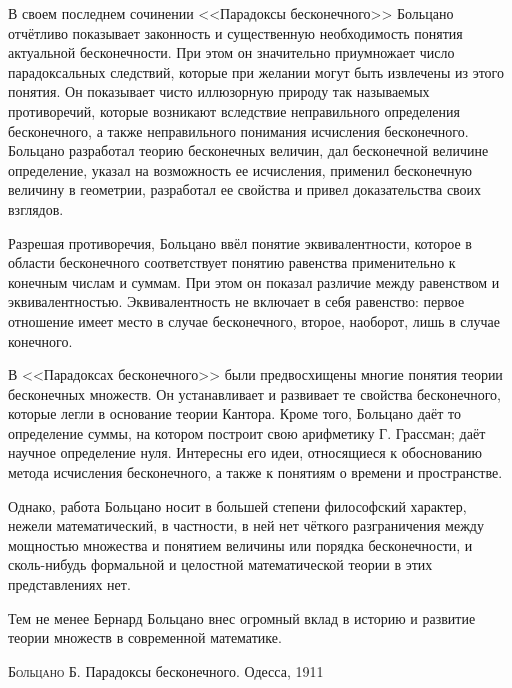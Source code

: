 \documentclass[12pt]{extarticle}
\begin{document}
В своем последнем сочинении <<Парадоксы бесконечного>> Больцано отчётливо показывает законность и существенную необходимость понятия актуальной бесконечности. При этом он значительно приумножает число парадоксальных следствий, которые при желании могут быть извлечены из этого понятия. Он показывает чисто иллюзорную природу так называемых противоречий, которые возникают вследствие неправильного определения бесконечного, а также неправильного понимания исчисления бесконечного. Больцано разработал теорию бесконечных величин, дал бесконечной величине определение, указал на возможность ее исчисления, применил бесконечную величину в геометрии, разработал ее свойства и привел доказательства своих взглядов.

Разрешая противоречия, Больцано ввёл понятие эквивалентности, которое в области бесконечного соответствует понятию равенства применительно к конечным числам и суммам. При этом он показал различие между равенством и эквивалентностью. Эквивалентность не включает в себя равенство: первое отношение имеет место в случае бесконечного, второе, наоборот, лишь в случае конечного.

В <<Парадоксах бесконечного>> были предвосхищены многие понятия теории бесконечных множеств. Он устанавливает и развивает те свойства бесконечного, которые легли в основание теории Кантора. Кроме того, Больцано даёт то определение суммы, на котором построит свою арифметику Г. Грассман; даёт научное определение нуля. Интересны его идеи, относящиеся к обоснованию метода исчисления бесконечного, а также к понятиям о времени и пространстве. 

Однако, работа Больцано носит в большей степени философский характер, нежели математический, в частности, в ней нет чёткого разграничения между мощностью множества и понятием величины или порядка бесконечности, и сколь-нибудь формальной и целостной математической теории в этих представлениях нет.

Тем не менее Бернард Больцано внес огромный вклад в историю и развитие теории множеств в современной математике.


\newpage
\begin{thebibliography}{99}
\textsc{Больцано Б.} Парадоксы бесконечного. Одесса, 1911
\end{thebibliography}
\end{document}
